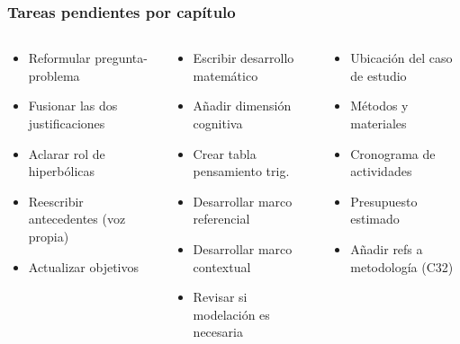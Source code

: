 \documentclass[11pt, aspectratio=169, spanish]{beamer}
\newcommand{\semWA}{\textcolor{AmarilloAv}{\faExclamationCircle}}
\newcommand{\semNO}{\textcolor{RojoAlerta}{\faTimesCircle}}
\begin{document}
\begin{frame}[plain, shrink=22]
\frametitle{\faTasks\quad Tareas pendientes por capítulo}
\vspace{0pt}

\begin{columns}[T]
\begin{tcolorbox}[colback=AzulInfo!7, colframe=AzulInfo!65, arc=2mm,
  title={\footnotesize\textbf{\faExclamationCircle\; Cap. 1 — Alta prioridad}}]
{\scriptsize
\begin{itemize}[leftmargin=*, itemsep=2.5pt]
  \item[\semNO] Reformular pregunta-problema
  \item[\semNO] Fusionar las dos justificaciones
  \item[\semNO] Aclarar rol de hiperbólicas
  \item[\semWA] Reescribir antecedentes (voz propia)
  \item[\semWA] Actualizar objetivos
\end{itemize}}
\end{tcolorbox}

\begin{tcolorbox}[colback=MoradoMarco!7, colframe=MoradoMarco!65, arc=2mm,
  title={\footnotesize\textbf{\faExclamationCircle\; Cap. 2 — Alta prioridad}}]
{\scriptsize
\begin{itemize}[leftmargin=*, itemsep=2.5pt]
  \item[\semNO] Escribir desarrollo matemático
  \item[\semNO] Añadir dimensión cognitiva
  \item[\semNO] Crear tabla pensamiento trig.
  \item[\semWA] Desarrollar marco referencial
  \item[\semWA] Desarrollar marco contextual
  \item[\semWA] Revisar si modelación es necesaria
\end{itemize}}
\end{tcolorbox}

\begin{tcolorbox}[colback=VerdeUNAL!7, colframe=VerdeUNAL!65, arc=2mm,
  title={\footnotesize\textbf{\faClock\; Cap. 3 — Prioridad media}}]
{\scriptsize
\begin{itemize}[leftmargin=*, itemsep=2.5pt]
  \item[\semNO] Ubicación del caso de estudio
  \item[\semNO] Métodos y materiales
  \item[\semNO] Cronograma de actividades
  \item[\semNO] Presupuesto estimado
  \item[\semWA] Añadir refs a metodología (C32)
\end{itemize}}
\end{tcolorbox}
\end{columns}


\end{frame}
\end{document}
